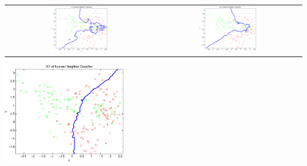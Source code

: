 \documentclass[pra,groupedaddress,amsmath,amssymb, column]{revtex4}
\begin{document}
\begin{tabular}{cc}
\includegraphics[width=0.4\textwidth]{Q1a3.pdf} &
\includegraphics[width=0.4\textwidth]{Q1a4.pdf}
\end{tabular}
\begin{center}
\includegraphics[width=0.4\textwidth]{Q1a5.pdf} 
\end{center}
\end{document}
